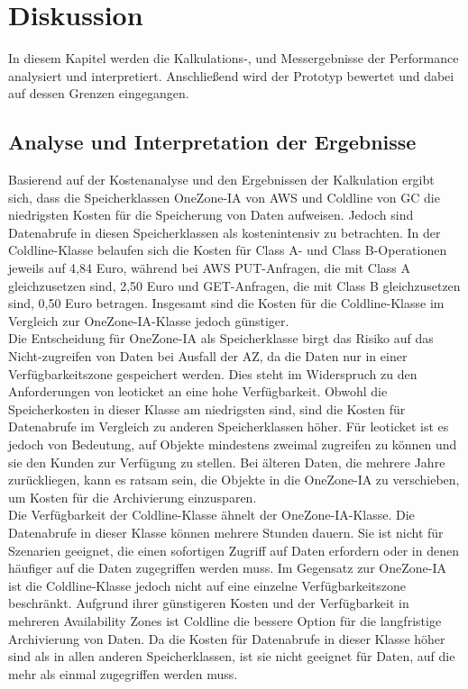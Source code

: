 \chapter{Diskussion}

In diesem Kapitel werden die Kalkulations-, und Messergebnisse der Performance analysiert und interpretiert. Anschließend wird der Prototyp bewertet und dabei auf dessen Grenzen eingegangen.
  
\section{Analyse und Interpretation der Ergebnisse}

Basierend auf der Kostenanalyse und den Ergebnissen der Kalkulation ergibt sich, dass die Speicherklassen OneZone-IA von AWS und Coldline von GC die niedrigsten Kosten für die Speicherung von Daten aufweisen. Jedoch sind Datenabrufe in diesen Speicherklassen als kostenintensiv zu betrachten. In der Coldline-Klasse belaufen sich die Kosten für Class A- und Class B-Operationen jeweils auf 4,84 Euro, während bei AWS PUT-Anfragen, die mit Class A gleichzusetzen sind, 2,50 Euro und GET-Anfragen, die mit Class B gleichzusetzen sind, 0,50 Euro betragen. Insgesamt sind die Kosten für die Coldline-Klasse im Vergleich zur OneZone-IA-Klasse jedoch günstiger.\\ 


Die Entscheidung für OneZone-IA als Speicherklasse birgt das Risiko auf das Nicht-zugreifen von Daten bei Ausfall der AZ, da die Daten nur in einer Verfügbarkeitszone gespeichert werden. Dies steht im Widerspruch zu den Anforderungen von leoticket an eine hohe Verfügbarkeit. Obwohl die Speicherkosten in dieser Klasse am niedrigsten sind, sind die Kosten für Datenabrufe im Vergleich zu anderen Speicherklassen höher. Für leoticket ist es jedoch von Bedeutung, auf Objekte mindestens zweimal zugreifen zu können und sie den Kunden zur Verfügung zu stellen. Bei älteren Daten, die mehrere Jahre zurückliegen, kann es ratsam sein, die Objekte in die OneZone-IA zu verschieben, um Kosten für die Archivierung einzusparen.\\

Die Verfügbarkeit der Coldline-Klasse ähnelt der OneZone-IA-Klasse. Die Datenabrufe in dieser Klasse können mehrere Stunden dauern. Sie ist nicht für Szenarien geeignet, die einen sofortigen Zugriff auf Daten erfordern oder in denen häufiger auf die Daten zugegriffen werden muss. Im Gegensatz zur OneZone-IA ist die Coldline-Klasse jedoch nicht auf eine einzelne Verfügbarkeitszone beschränkt. Aufgrund ihrer günstigeren Kosten und der Verfügbarkeit in mehreren Availability Zones ist Coldline die bessere Option für die langfristige Archivierung von Daten. Da die Kosten für Datenabrufe in dieser Klasse höher sind als in allen anderen Speicherklassen, ist sie nicht geeignet für Daten, auf die mehr als einmal zugegriffen werden muss.\\

